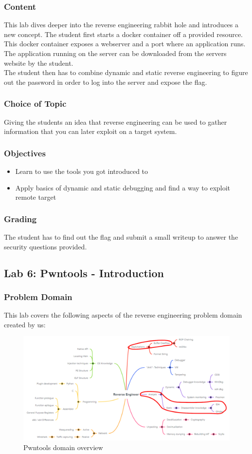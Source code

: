 \subsubsection*{Content}
This lab dives deeper into the reverse engineering rabbit hole and introduces a new concept. The student first starts a docker container off a provided resource.
This docker container exposes a webserver and a port where an application runs. The application running on the server can be downloaded from the servers website by the student. \\
The student then has to combine dynamic and static reverse engineering to figure out the password in order to log into the server and expose the flag.
\subsubsection*{Choice of Topic}
Giving the students an idea that reverse engineering can be used to gather information that you can later exploit on a target system.
\subsubsection*{Objectives}
\begin{itemize}
    \item Learn to use the tools you got introduced to
    \item Apply basics of dynamic and static debugging and find a way to exploit remote target 
\end{itemize}
\subsubsection*{Grading}
The student has to find out the flag and submit a small writeup to answer the security questions provided.
\pagebreak

\subsection{Lab 6: Pwntools - Introduction}
\subsubsection*{Problem Domain}
This lab covers the following aspects of the reverse engineering problem domain created by us:
\vspace{-2ex}
\begin{figure}[H]
    \includegraphics[width=\textwidth]{resources/pwntools-overview-light.png}
    \caption{Pwntools domain overview}
    \label{fig:pwntools-overview}
\end{figure}
